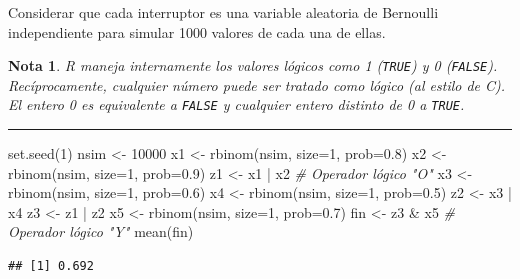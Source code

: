 \documentclass[
]{book}
\newenvironment{Shaded}{\begin{snugshade}}{\end{snugshade}}
\newcommand{\AttributeTok}[1]{\textcolor[rgb]{0.77,0.63,0.00}{#1}}
\newcommand{\CommentTok}[1]{\textcolor[rgb]{0.56,0.35,0.01}{\textit{#1}}}
\newcommand{\DecValTok}[1]{\textcolor[rgb]{0.00,0.00,0.81}{#1}}
\newcommand{\FloatTok}[1]{\textcolor[rgb]{0.00,0.00,0.81}{#1}}
\newcommand{\FunctionTok}[1]{\textcolor[rgb]{0.00,0.00,0.00}{#1}}
\newcommand{\NormalTok}[1]{#1}
\newcommand{\OtherTok}[1]{\textcolor[rgb]{0.56,0.35,0.01}{#1}}
\newcommand{\SpecialCharTok}[1]{\textcolor[rgb]{0.00,0.00,0.00}{#1}}
\theoremstyle{break}
\theoremstyle{nonumberplain}
\newtheorem{remark}{Nota}
\begin{document}
Considerar que cada interruptor es una variable aleatoria de Bernoulli independiente
para simular 1000 valores de cada una de ellas.

\begin{remark}
{}R maneja internamente los valores lógicos como 1 (\texttt{TRUE}) y 0 (\texttt{FALSE}).
Recíprocamente, cualquier número puede ser tratado como lógico (al estilo de C).
El entero 0 es equivalente a \texttt{FALSE} y cualquier entero distinto de 0 a \texttt{TRUE}.
\end{remark}

\begin{center}\rule{0.5\linewidth}{0.5pt}\end{center}

\begin{Shaded}
\begin{Highlighting}[]
\FunctionTok{set.seed}\NormalTok{(}\DecValTok{1}\NormalTok{)}
\NormalTok{nsim }\OtherTok{\textless{}{-}} \DecValTok{10000}
\NormalTok{x1 }\OtherTok{\textless{}{-}} \FunctionTok{rbinom}\NormalTok{(nsim, }\AttributeTok{size=}\DecValTok{1}\NormalTok{, }\AttributeTok{prob=}\FloatTok{0.8}\NormalTok{)}
\NormalTok{x2 }\OtherTok{\textless{}{-}} \FunctionTok{rbinom}\NormalTok{(nsim, }\AttributeTok{size=}\DecValTok{1}\NormalTok{, }\AttributeTok{prob=}\FloatTok{0.9}\NormalTok{)}
\NormalTok{z1 }\OtherTok{\textless{}{-}}\NormalTok{ x1 }\SpecialCharTok{|}\NormalTok{ x2   }\CommentTok{\# Operador lógico "O"}
\NormalTok{x3 }\OtherTok{\textless{}{-}} \FunctionTok{rbinom}\NormalTok{(nsim, }\AttributeTok{size=}\DecValTok{1}\NormalTok{, }\AttributeTok{prob=}\FloatTok{0.6}\NormalTok{)}
\NormalTok{x4 }\OtherTok{\textless{}{-}} \FunctionTok{rbinom}\NormalTok{(nsim, }\AttributeTok{size=}\DecValTok{1}\NormalTok{, }\AttributeTok{prob=}\FloatTok{0.5}\NormalTok{)}
\NormalTok{z2 }\OtherTok{\textless{}{-}}\NormalTok{ x3 }\SpecialCharTok{|}\NormalTok{ x4}
\NormalTok{z3 }\OtherTok{\textless{}{-}}\NormalTok{ z1 }\SpecialCharTok{|}\NormalTok{ z2}
\NormalTok{x5 }\OtherTok{\textless{}{-}} \FunctionTok{rbinom}\NormalTok{(nsim, }\AttributeTok{size=}\DecValTok{1}\NormalTok{, }\AttributeTok{prob=}\FloatTok{0.7}\NormalTok{)}
\NormalTok{fin }\OtherTok{\textless{}{-}}\NormalTok{ z3 }\SpecialCharTok{\&}\NormalTok{ x5  }\CommentTok{\# Operador lógico "Y"}
\FunctionTok{mean}\NormalTok{(fin)}
\end{Highlighting}
\end{Shaded}

\begin{verbatim}
## [1] 0.692
\end{verbatim}
\end{document}
